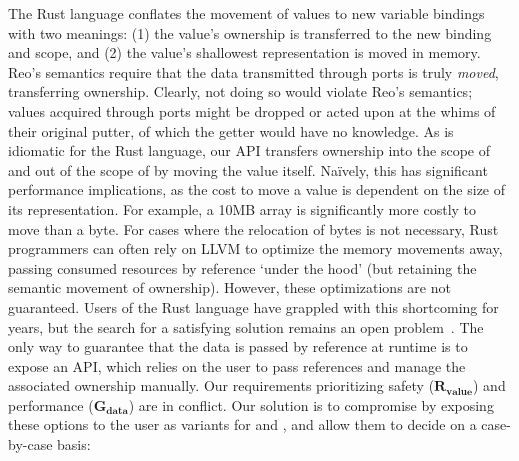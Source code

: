 The Rust language conflates the movement of values to new variable bindings with two meanings: (1) the value's ownership is transferred to the new binding and scope, and (2) the value's shallowest representation is moved in memory. Reo's semantics require that the data transmitted through ports is truly \textit{moved}, transferring ownership. Clearly, not doing so would violate Reo's semantics; values acquired through ports might be dropped or acted upon at the whims of their original putter, of which the getter would have no knowledge. As is idiomatic for the Rust language, our API transfers ownership into the scope of  and out of the scope of  by moving the value itself. Na\"ively, this has significant performance implications, as the cost to move a value is dependent on the size of its representation. For example, a 10MB array is significantly more costly to move than a byte. For cases where the relocation of bytes is not necessary, Rust programmers can often rely on LLVM to optimize the memory movements away, passing consumed resources by reference `under the hood' (but retaining the semantic movement of ownership). However, these optimizations are not guaranteed. Users of the Rust language have grappled with this shortcoming for years, but the search for a satisfying solution remains an open problem~\cite{matsakis_2015}. The only way to guarantee that the data is passed by reference at runtime is to expose an  API, which relies on the user to pass references and manage the associated ownership manually. Our requirements prioritizing safety ($\boldsymbol{R_{value}}$) and performance ($\boldsymbol{G_{data}}$) are in conflict. Our solution is to compromise by exposing these options to the user as variants for  and , and allow them to decide on a case-by-case basis: 

